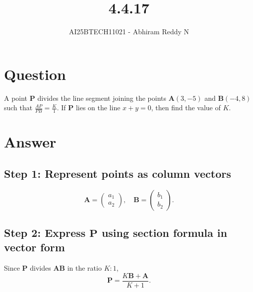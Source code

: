 \documentclass[journal]{IEEEtran}
\begin{document}

\vspace{3cm}

\title{4.4.17}
\author{AI25BTECH11021 - Abhiram Reddy N}
{\let\newpage\relax\maketitle}

\renewcommand{\thefigure}{\theenumi}
\renewcommand{\thetable}{\theenumi}
\setlength{\intextsep}{10pt} %


\renewcommand{\thetable}{\theenumi}


\section*{\textbf{Question}}
A point \(\mathbf{P}\) divides the line segment joining the points \(\mathbf{A}(3, -5)\) and \(\mathbf{B}(-4, 8)\) such that \(\frac{AP}{PB} = \frac{K}{1}\). If \(\mathbf{P}\) lies on the line \(x + y = 0\), then find the value of \(K\).

\section*{\textbf{Answer}}

\subsection*{\textbf{Step 1: Represent points as column vectors}}
\[
\mathbf{A} = \begin{pmatrix} a_1 \\ a_2 \end{pmatrix}, \quad 
\mathbf{B} = \begin{pmatrix} b_1 \\ b_2 \end{pmatrix}.
\]

\subsection*{\textbf{Step 2: Express \(\mathbf{P}\) using section formula in vector form}}
Since \(\mathbf{P}\) divides \(\mathbf{AB}\) in the ratio \(K : 1\), 
\[
\mathbf{P} = \frac{K \mathbf{B} + \mathbf{A}}{K + 1}.
\]
\end{document}
